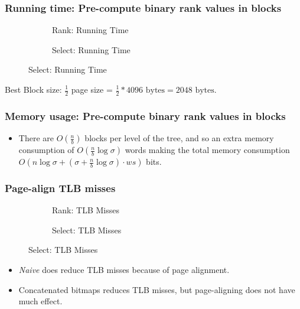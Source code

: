 \documentclass{beamer}
\begin{document}
\begin{frame}
\frametitle{Running time: Pre-compute binary rank values in blocks}
\begin{figure}
\begin{subfigure}{0.45\textwidth}
	\begin{tiny}	
	\scalebox{.7}{}
	\end{tiny}
	\caption{Rank: Running Time}
\end{subfigure}
\hfill
\begin{subfigure}{0.45\textwidth}
	\begin{tiny}	
	\scalebox{.7}{}
	\end{tiny}
	\caption{Select: Running Time}
\end{subfigure}
\end{figure}
Best Block size: $\frac{1}{2}$ page size = $\frac{1}{2}*4096 \text{ bytes} = 2048 \text{ bytes}$.
\end{frame}

\begin{frame}
\frametitle{Memory usage: Pre-compute binary rank values in blocks}
\begin{itemize}
\item There are $O(\frac{n}{b})$ blocks per level of the tree, and so an extra memory consumption of $O(\frac{n}{b} \log \sigma)$ words making the total memory consumption $O(n \log \sigma + (\sigma + \frac{n}{b} \log \sigma) \cdot \mathit{ws})$ bits.
\end{itemize}
\begin{center}
\begin{tiny}
\scalebox{0.9}{}
\end{tiny}
\end{center}
\end{frame}


\begin{frame}
\frametitle{Page-align TLB misses}
\begin{figure}\tiny
\begin{subfigure}{0.48\textwidth}
	\scalebox{.7}{}
	\caption{Rank: TLB Misses}
\end{subfigure}
\hfill
\begin{subfigure}{0.48\textwidth}
	\scalebox{.7}{}
	\caption{Select: TLB Misses}
\end{subfigure}
\end{figure}
\begin{itemize}
\item \textit{Naive} does reduce TLB misses because of page alignment.
\item Concatenated bitmaps reduces TLB misses, but page-aligning does not have much effect.
\end{itemize}
\end{frame}
\end{document}
